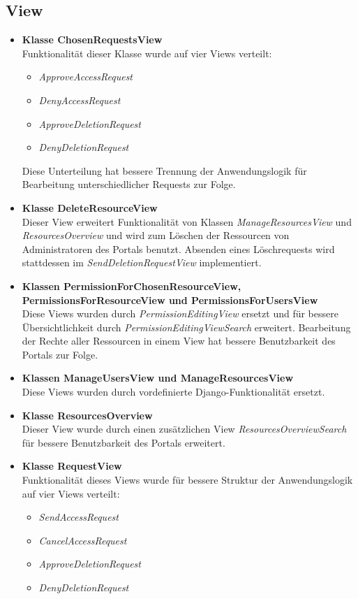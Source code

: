 \documentclass[parskip=full,11pt]{scrartcl}
\begin{document}
\newpage
\subsection{View} 
 
\begin{itemize}
\item \textbf{Klasse ChosenRequestsView}\\
Funktionalität dieser Klasse wurde auf vier Views verteilt:
\begin{itemize}
\item \textit{ApproveAccessRequest}
\item \textit{DenyAccessRequest}
\item \textit{ApproveDeletionRequest}
\item \textit{DenyDeletionRequest}
\end{itemize}
Diese Unterteilung hat bessere Trennung der Anwendungslogik für Bearbeitung unterschiedlicher Requests zur Folge. 

\item \textbf{Klasse DeleteResourceView}\\
Dieser View erweitert Funktionalität von Klassen \textit{ManageResourcesView} und \textit{ResourcesOverview} und wird zum Löschen der Ressourcen von Administratoren des Portals benutzt. Absenden eines Löschrequests wird stattdessen im \textit{SendDeletionRequestView} implementiert. 

\item \textbf{Klassen PermissionForChosenResourceView,  PermissionsForResourceView und PermissionsForUsersView}\\
Diese Views wurden durch \textit{PermissionEditingView} ersetzt und für bessere Übersichtlichkeit durch  \textit{PermissionEditingViewSearch} erweitert. Bearbeitung der Rechte aller Ressourcen in einem View hat bessere Benutzbarkeit des Portals zur Folge.

\item \textbf{Klassen ManageUsersView und ManageResourcesView}\\
Diese Views wurden durch vordefinierte Django-Funktionalität ersetzt.

\item \textbf{Klasse ResourcesOverview}\\
Dieser View wurde durch einen zusätzlichen View \textit{ResourcesOverviewSearch} für bessere Benutzbarkeit des Portals erweitert.

\item \textbf{Klasse RequestView}\\
Funktionalität dieses Views wurde für bessere Struktur der Anwendungslogik auf vier Views verteilt:
\begin{itemize}
\item \textit{SendAccessRequest}
\item \textit{CancelAccessRequest}
\item \textit{ApproveDeletionRequest}
\item \textit{DenyDeletionRequest}
\end{itemize}


\end{itemize}
\end{document}
